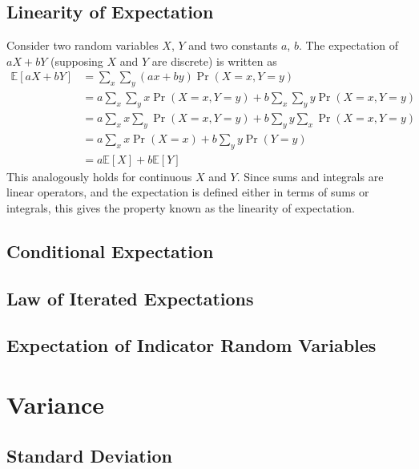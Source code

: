 \documentclass[11pt]{report} %
\begin{document}
\subsection{Linearity of Expectation}

Consider two random variables $X$, $Y$ and two constants $a$, $b$. The expectation of $aX + bY$ (supposing $X$ and $Y$ are discrete) is written as
\begin{align}
\mathbb{E}\left[aX + bY\right] &= \sum_{x}\sum_{y}\left(ax + by\right)\operatorname{Pr}\left(X = x, Y = y\right) \\
&= a\sum_{x}\sum_{y}x\operatorname{Pr}\left(X = x, Y = y\right) + b\sum_{x}\sum_{y}y\operatorname{Pr}\left(X = x, Y = y\right) \\
&= a\sum_{x}x\sum_{y}\operatorname{Pr}\left(X = x, Y = y\right) + b\sum_{y}y\sum_{x}\operatorname{Pr}\left(X = x, Y = y\right) \\
&= a\sum_{x}x\operatorname{Pr}\left(X = x\right) + b\sum_{y}y\operatorname{Pr}\left(Y = y\right) \\
&= a\mathbb{E}\left[X\right] + b\mathbb{E}\left[Y\right]
\end{align}
This analogously holds for continuous $X$ and $Y$. Since sums and integrals are linear operators, and the expectation is defined either in terms of sums or integrals, this gives the property known as the linearity of expectation.

\subsection{Conditional Expectation}

\subsection{Law of Iterated Expectations}

\subsection{Expectation of Indicator Random Variables}

\section{Variance}

\subsection{Standard Deviation}
\end{document}
